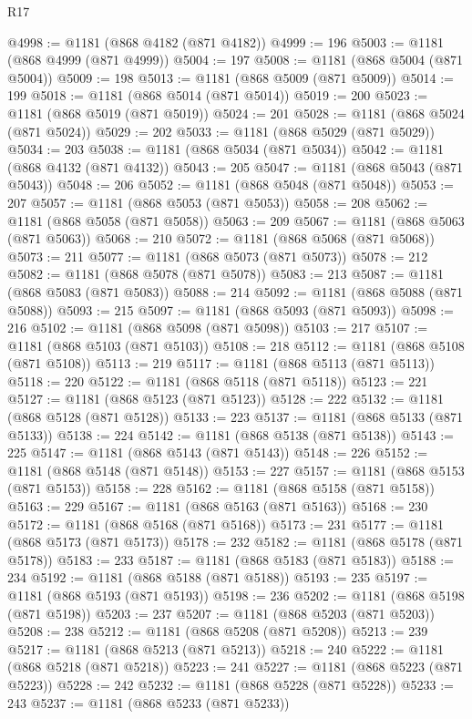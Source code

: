 \begin{lexlean}{R17}
\begin{coremodule}
@4998 := @1181 (@868 @4182 (@871 @4182))
@4999 := 196
@5003 := @1181 (@868 @4999 (@871 @4999))
@5004 := 197
@5008 := @1181 (@868 @5004 (@871 @5004))
@5009 := 198
@5013 := @1181 (@868 @5009 (@871 @5009))
@5014 := 199
@5018 := @1181 (@868 @5014 (@871 @5014))
@5019 := 200
@5023 := @1181 (@868 @5019 (@871 @5019))
@5024 := 201
@5028 := @1181 (@868 @5024 (@871 @5024))
@5029 := 202
@5033 := @1181 (@868 @5029 (@871 @5029))
@5034 := 203
@5038 := @1181 (@868 @5034 (@871 @5034))
@5042 := @1181 (@868 @4132 (@871 @4132))
@5043 := 205
@5047 := @1181 (@868 @5043 (@871 @5043))
@5048 := 206
@5052 := @1181 (@868 @5048 (@871 @5048))
@5053 := 207
@5057 := @1181 (@868 @5053 (@871 @5053))
@5058 := 208
@5062 := @1181 (@868 @5058 (@871 @5058))
@5063 := 209
@5067 := @1181 (@868 @5063 (@871 @5063))
@5068 := 210
@5072 := @1181 (@868 @5068 (@871 @5068))
@5073 := 211
@5077 := @1181 (@868 @5073 (@871 @5073))
@5078 := 212
@5082 := @1181 (@868 @5078 (@871 @5078))
@5083 := 213
@5087 := @1181 (@868 @5083 (@871 @5083))
@5088 := 214
@5092 := @1181 (@868 @5088 (@871 @5088))
@5093 := 215
@5097 := @1181 (@868 @5093 (@871 @5093))
@5098 := 216
@5102 := @1181 (@868 @5098 (@871 @5098))
@5103 := 217
@5107 := @1181 (@868 @5103 (@871 @5103))
@5108 := 218
@5112 := @1181 (@868 @5108 (@871 @5108))
@5113 := 219
@5117 := @1181 (@868 @5113 (@871 @5113))
@5118 := 220
@5122 := @1181 (@868 @5118 (@871 @5118))
@5123 := 221
@5127 := @1181 (@868 @5123 (@871 @5123))
@5128 := 222
@5132 := @1181 (@868 @5128 (@871 @5128))
@5133 := 223
@5137 := @1181 (@868 @5133 (@871 @5133))
@5138 := 224
@5142 := @1181 (@868 @5138 (@871 @5138))
@5143 := 225
@5147 := @1181 (@868 @5143 (@871 @5143))
@5148 := 226
@5152 := @1181 (@868 @5148 (@871 @5148))
@5153 := 227
@5157 := @1181 (@868 @5153 (@871 @5153))
@5158 := 228
@5162 := @1181 (@868 @5158 (@871 @5158))
@5163 := 229
@5167 := @1181 (@868 @5163 (@871 @5163))
@5168 := 230
@5172 := @1181 (@868 @5168 (@871 @5168))
@5173 := 231
@5177 := @1181 (@868 @5173 (@871 @5173))
@5178 := 232
@5182 := @1181 (@868 @5178 (@871 @5178))
@5183 := 233
@5187 := @1181 (@868 @5183 (@871 @5183))
@5188 := 234
@5192 := @1181 (@868 @5188 (@871 @5188))
@5193 := 235
@5197 := @1181 (@868 @5193 (@871 @5193))
@5198 := 236
@5202 := @1181 (@868 @5198 (@871 @5198))
@5203 := 237
@5207 := @1181 (@868 @5203 (@871 @5203))
@5208 := 238
@5212 := @1181 (@868 @5208 (@871 @5208))
@5213 := 239
@5217 := @1181 (@868 @5213 (@871 @5213))
@5218 := 240
@5222 := @1181 (@868 @5218 (@871 @5218))
@5223 := 241
@5227 := @1181 (@868 @5223 (@871 @5223))
@5228 := 242
@5232 := @1181 (@868 @5228 (@871 @5228))
@5233 := 243
@5237 := @1181 (@868 @5233 (@871 @5233))

\end{coremodule}
\end{lexlean}
